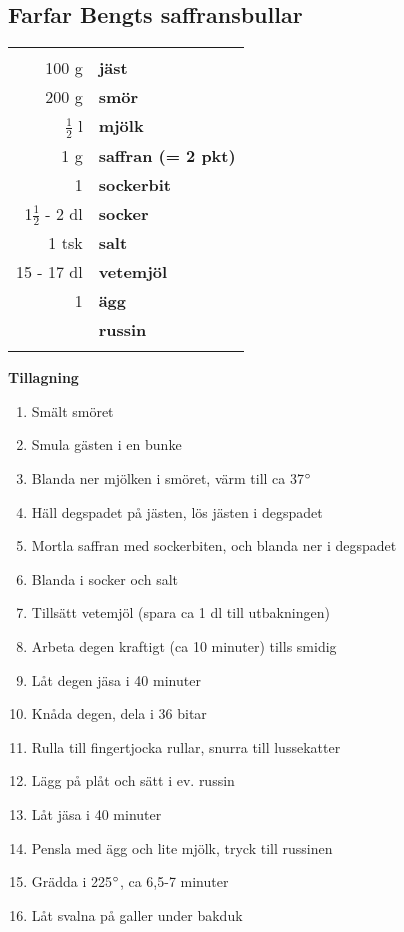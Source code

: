 \clearpage

\subsection{Farfar Bengts saffransbullar}

\begin{table}[H]
	\begin{tabular}{rl}
	\hline
	&\\
		100 g & \textbf{jäst} \\
		200 g & \textbf{smör} \\
		$\frac{1}{2}$ l & \textbf{mjölk} \\
		1 g & \textbf{saffran (= 2 pkt)} \\
		1 & \textbf{sockerbit} \\
		1$\frac{1}{2}$ - 2 dl & \textbf{socker} \\
		1 tsk & \textbf{salt} \\
		15 - 17 dl & \textbf{vetemjöl} \\
		1 & \textbf{ägg} \\
		& \textbf{russin} \\
	&\\
	\hline
	\end{tabular}
\end{table}

\begin{multicols*}{2}

\noindent \textbf{Tillagning}
\begin{enumerate}
	\itemsep0cm
	\item Smält smöret
	\item Smula gästen i en bunke
	\item Blanda ner mjölken i smöret, värm till ca 37$\degree$
	\item Häll degspadet på jästen, lös jästen i degspadet
	\item Mortla saffran med sockerbiten, och blanda ner i degspadet
	\item	Blanda i socker och salt
	\item Tillsätt vetemjöl (spara ca 1 dl till utbakningen)
	\item Arbeta degen kraftigt (ca 10 \mbox{minuter}) tills smidig
	\item Låt degen jäsa i 40 minuter
	\item Knåda degen, dela i 36 bitar
	\item Rulla till fingertjocka rullar, \mbox{snurra} till lussekatter
	\item Lägg på plåt och sätt i ev. \mbox{russin}
	\item Låt jäsa i 40 minuter
	\item Pensla med ägg och lite mjölk, tryck till russinen
	\item Grädda i 225$\degree$, ca 6,5-7 minuter
	\item Låt svalna på galler under bakduk
\end{enumerate}

\end{multicols*}

\clearpage